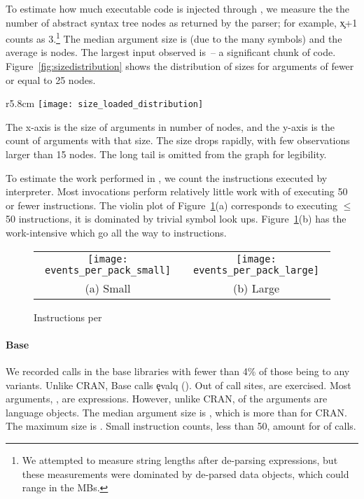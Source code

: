 \documentclass[screen,acmsmall]{acmart}
\begin{document}
To estimate how much executable code is injected through \eval, we measure the
the number of abstract syntax tree nodes as returned by the parser; for example,
\c{x+1} counts as 3.\footnote{We attempted to measure string lengths after
de-parsing expressions, but these measurements were dominated by de-parsed data
objects, which could range in the MBs.} The median argument size is
\Medianszeval (due to the many symbols) and the average is \Avgszeval nodes. The
largest \eval input observed is \Maxszeval\,-- a significant chunk of code.
Figure~\ref{fig:sizedistribution} shows the distribution of sizes for arguments
of fewer or equal to 25 nodes.
%
\begin{wrapfigure}{r}{5.8cm}
 \hspace*{-10mm}
 \texttt{[image: size\_loaded\_distribution]}
 \caption{Loaded code} \label{fig:sizedistribution}
\end{wrapfigure}
%
The x-axis is the size of arguments in number of
nodes, and the y-axis is the count of arguments with that size. The size drops
rapidly, with few observations larger than 15 nodes. The long tail is omitted
from the graph for legibility.

To estimate the work performed in \evals, we count the instructions executed by
interpreter. Most invocations perform relatively little work with
\Smalleventspct of \evals executing 50 or fewer instructions. The violin plot of
Figure~\ref{ev}(a) corresponds to \evals executing $\leq$ 50 instructions, it is
dominated by trivial symbol look ups. Figure~\ref{ev}(b) has the work-intensive
\evals which go all the way to \MaxeventsRnd instructions.

\begin{figure}[tb!]
\begin{tabular}{@{}c@{}c@{}}
\begin{minipage}{7.5cm}
 \texttt{[image: events\_per\_pack\_small]}
\end{minipage}&\begin{minipage}{7.5cm}
  \texttt{[image: events\_per\_pack\_large]}
\end{minipage}\\[-3mm]
\small (a) Small & \small (b) Large
\end{tabular}
 \caption{Instructions per \eval} \label{ev}
\end{figure}

\paragraph{Base}
We recorded \baseAllcalls \eval calls in the base libraries with fewer than 4\%
of those being to any variants. Unlike CRAN, Base calls \c{evalq} (\baseEvalqs).
Out of \baseStaticeval call sites, \baseTriggeredevalpct are exercised. Most
arguments, \baseCodepercent, are expressions. However, unlike CRAN,
\baseLanguagepercent of the arguments are language objects. The median argument
size is \baseMedianszeval, which is more than for CRAN. The maximum size is
\baseMaxszeval. Small instruction counts, less than 50, amount for
\baseSmalleventspct of calls.
\end{document}

